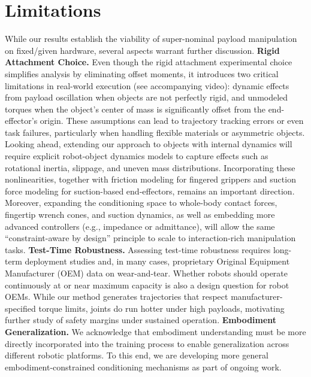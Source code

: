 \section{Limitations}

While our results establish the viability of super-nominal payload manipulation on fixed/given hardware, several aspects warrant further discussion. \textbf{Rigid Attachment Choice.} Even though the rigid attachment experimental choice simplifies analysis by eliminating offset moments, it introduces two critical limitations in real-world execution (see accompanying video): dynamic effects from payload oscillation when objects are not perfectly rigid, and unmodeled torques when the object's center of mass is significantly offset from the end-effector's origin. These assumptions can lead to trajectory tracking errors or even task failures, particularly when handling flexible materials or asymmetric objects. Looking ahead, extending our approach to objects with internal dynamics will require explicit robot-object dynamics models to capture effects such as rotational inertia, slippage, and uneven mass distributions. Incorporating these nonlinearities, together with friction modeling for fingered grippers and suction force modeling for suction-based end-effectors, remains an important direction. Moreover, expanding the conditioning space to whole-body contact forces, fingertip wrench cones, and suction dynamics, as well as embedding more advanced controllers (e.g., impedance or admittance), will allow the same ``constraint-aware by design'' principle to scale to interaction-rich manipulation tasks. \textbf{Test-Time Robustness.} Assessing test-time robustness requires long-term deployment studies and, in many cases, proprietary Original Equipment Manufacturer (OEM) data on wear-and-tear. Whether robots should operate continuously at or near maximum capacity is also a design question for robot OEMs. While our method generates trajectories that respect manufacturer-specified torque limits, joints do run hotter under high payloads, motivating further study of safety margins under sustained operation. \textbf{Embodiment Generalization.} We acknowledge that embodiment understanding must be more directly incorporated into the training process to enable generalization across different robotic platforms. To this end, we are developing more general embodiment-constrained conditioning mechanisms as part of ongoing work.

